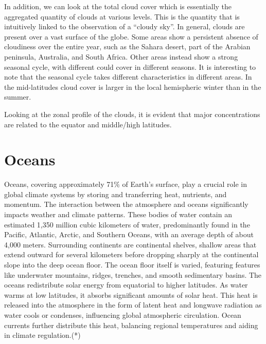 In addition, we can look at the total cloud cover which is essentially the aggregated quantity of clouds at various levels. This is the quantity that is intuitively linked to the observation of a “cloudy sky”. In general, clouds are present over a vast surface of the globe. Some areas show a persistent absence of cloudiness over the entire year, such as the Sahara desert, part of the Arabian peninsula, Australia, and South Africa. Other areas instead show a strong seasonal cycle, with different could cover in different seasons. It is interesting to note that the seasonal cycle takes different characteristics in different areas. In the mid-latitudes cloud cover is larger in the local hemispheric winter than in the summer.

Looking at the zonal profile of the clouds, it is evident that major concentrations are related to the equator and middle/high latitudes.



\section{Oceans}
Oceans, covering approximately 71\% of Earth's surface, play a crucial role in global climate systems by storing and transferring heat, nutrients, and momentum. The interaction between the atmosphere and oceans significantly impacts weather and climate patterns. These bodies of water contain an estimated 1,350 million cubic kilometers of water, predominantly found in the Pacific, Atlantic, Arctic, and Southern Oceans, with an average depth of about 4,000 meters.
\newline Surrounding continents are continental shelves, shallow areas that extend outward for several kilometers before dropping sharply at the continental slope into the deep ocean floor. The ocean floor itself is varied, featuring features like underwater mountains, ridges, trenches, and smooth sedimentary basins.
\newline The oceans redistribute solar energy from equatorial to higher latitudes. As water warms at low latitudes, it absorbs significant amounts of solar heat. This heat is released into the atmosphere in the form of latent heat and longwave radiation as water cools or condenses, influencing global atmospheric circulation. Ocean currents further distribute this heat, balancing regional temperatures and aiding in climate regulation.(*)
